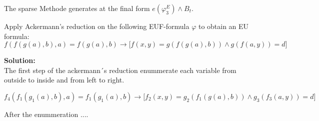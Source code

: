\documentclass[11pt,a4paper]{uebung}
\newcommand{\solution}[1]{\par {\bf Solution:}\\#1}
\begin{document}
  The sparse Methode generates at the final form  $e(\varphi^E_3) \land B_t$.

  


\newpage
{}
Apply Ackermann's reduction on the following EUF-formula $\varphi$ to obtain
an EU formula:
\begin{displaymath}
  f\left(f\left(g\left(a\right),b\right),a\right) = f(g(a),b) \rightarrow \big[ f(x,y) = g(f(g(a),b)) \land
  g(f(a,y))=d \big]
\end{displaymath}


\solution{
  The first step of the ackermann´s reduction enummerate each variable from outside to inside and from left to right. 
 
 \begin{displaymath}
  f_4\left(f_1\left(g_1\left(a\right),b\right),a\right) = f_1(g_1(a),b) \rightarrow \big[ f_2(x,y) = g_2(f_1(g(a),b)) \land
   g_3(f_3(a,y))=d \big]
 \end{displaymath}

After the enummeration ....

  


}
\end{document}
